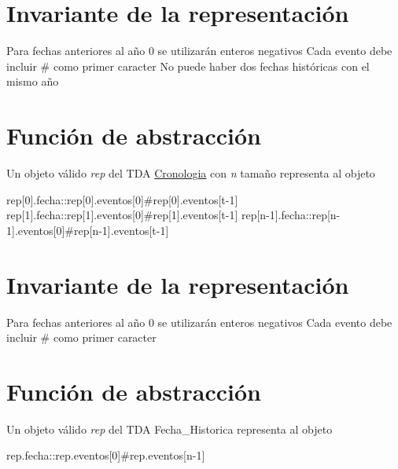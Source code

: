 \hypertarget{repConjunto_invConjunto}{}\section{Invariante de la representación}\label{repConjunto_invConjunto}
Para fechas anteriores al año 0 se utilizarán enteros negativos Cada evento debe incluir \# como primer caracter No puede haber dos fechas históricas con el mismo año\hypertarget{repConjunto_faConjunto}{}\section{Función de abstracción}\label{repConjunto_faConjunto}
Un objeto válido {\itshape rep} del T\+DA \hyperlink{classCronologia}{Cronologia} con {\itshape n} tamaño representa al objeto

rep\mbox{[}0\mbox{]}.fecha\+::rep\mbox{[}0\mbox{]}.eventos\mbox{[}0\mbox{]}\#rep\mbox{[}0\mbox{]}.eventos\mbox{[}t-\/1\mbox{]} rep\mbox{[}1\mbox{]}.fecha\+::rep\mbox{[}1\mbox{]}.eventos\mbox{[}0\mbox{]}\#rep\mbox{[}1\mbox{]}.eventos\mbox{[}t-\/1\mbox{]} rep\mbox{[}n-\/1\mbox{]}.fecha\+::rep\mbox{[}n-\/1\mbox{]}.eventos\mbox{[}0\mbox{]}\#rep\mbox{[}n-\/1\mbox{]}.eventos\mbox{[}t-\/1\mbox{]}\hypertarget{repConjunto_invConjunto}{}\section{Invariante de la representación}\label{repConjunto_invConjunto}
Para fechas anteriores al año 0 se utilizarán enteros negativos Cada evento debe incluir \# como primer caracter\hypertarget{repConjunto_faConjunto}{}\section{Función de abstracción}\label{repConjunto_faConjunto}
Un objeto válido {\itshape rep} del T\+DA Fecha\+\_\+\+Historica representa al objeto

rep.\+fecha\+::rep.\+eventos\mbox{[}0\mbox{]}\#rep.\+eventos\mbox{[}n-\/1\mbox{]} 
